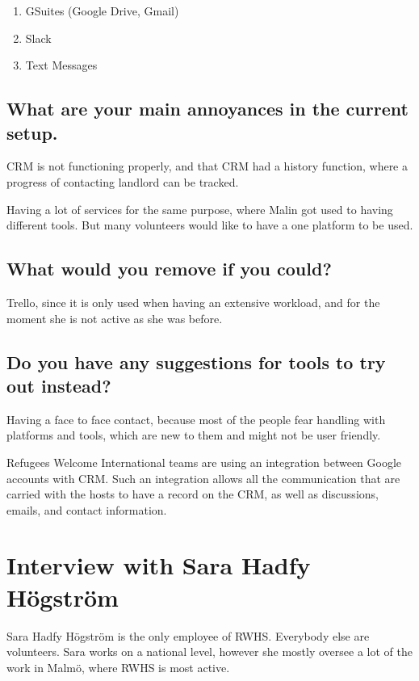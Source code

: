 \begin{enumerate}
\item GSuites (Google Drive, Gmail)
\item Slack
\item Text Messages
\end{enumerate}
 
\subsection{What are your main annoyances in the current setup.}
CRM is not functioning properly, and that CRM had a history function, where a progress of contacting landlord can be tracked.
 
Having a lot of services for the same purpose, where Malin got used to having different tools. But many volunteers would like to have a one platform to be used. 
 
\subsection{What would you remove if you could?}
Trello, since it is only used when having an extensive workload, and for the moment she is not active as she was before.
 
\subsection{Do you have any suggestions for tools to try out instead?}
Having a face to face contact, because most of the people fear handling with platforms and tools, which are new to them and might not be user friendly.

Refugees Welcome International teams are using an integration between Google accounts with CRM. Such an integration allows all the communication that are carried with the hosts to have a record on the CRM, as well as discussions, emails, and contact information. 



\section{Interview with Sara Hadfy Högström}
\label{app:sara-hadfy}
Sara Hadfy Högström is the only employee of RWHS. Everybody else are volunteers. Sara works on a national level, however she mostly oversee a lot of the work in Malmö, where RWHS is most active.

